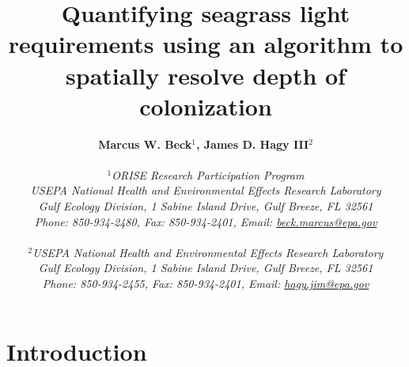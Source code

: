 \documentclass[letterpaper,12pt,oneside]{article}\usepackage[]{graphicx}\usepackage[]{color}
\begin{document}
\raggedbottom
\linenumbers
\raggedright
{}
\setlength{\parindent}{0.5in}
\renewcommand\refname{References \vspace{12pt}}

\begin{singlespace}
\title{{\bf {\Large Quantifying seagrass light requirements using an algorithm to spatially resolve depth of colonization}}}
\author{
  {\bf {\normalsize Marcus W. Beck$^1$, James D. Hagy III$^2$}}
  \\\\{\textit {\normalsize $^1$ORISE Research Participation Program}}
  \\{\textit {\normalsize USEPA National Health and Environmental Effects Research Laboratory}}
  \\{\textit {\normalsize Gulf Ecology Division, 1 Sabine Island Drive, Gulf Breeze, FL 32561}}
	\\{\textit {\normalsize Phone: 850-934-2480, Fax: 850-934-2401, Email: \href{mailto:beck.marcus@epa.gov}{beck.marcus@epa.gov}}}
  \\\\{\textit {\normalsize $^2$USEPA National Health and Environmental Effects Research Laboratory}}
	\\{\textit {\normalsize Gulf Ecology Division, 1 Sabine Island Drive, Gulf Breeze, FL 32561}}
	\\{\textit {\normalsize Phone: 850-934-2455, Fax: 850-934-2401, Email: \href{mailto:hagy.jim@epa.gov}{hagy.jim@epa.gov}}}
	}
\date{}
\maketitle
\end{singlespace}
\clearpage

\section{Introduction}
\end{document}
